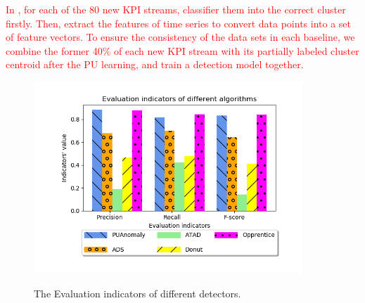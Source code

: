 \textcolor{red}{In \name{}, for each of the 80 new KPI streams, classifier them into the correct cluster firstly. Then, extract the features of time series to convert data points into a set of feature vectors. To ensure the consistency of the data sets in each baseline, we combine the former 40\% of each new KPI stream with its partially labeled cluster centroid after the PU learning, and train a detection model together.} 

\begin{figure}
  \begin{minipage}{1.0\linewidth}
  \centering
  \includegraphics[width=0.9\textwidth]{ADS_Journal/PU figures/change_1.png}\\
  \end{minipage}
  \caption{The Evaluation indicators of different detectors.}
  \label{fig:Evalution indicators}
\end{figure}

